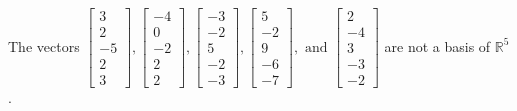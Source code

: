 \begin{exercise}
\begin{exerciseStatement}
  \end{exerciseStatement}
  \begin{exerciseAnswer}
   The vectors \(\left[\begin{array}{r}
3 \\
2 \\
-5 \\
2 \\
3
\end{array}\right] , \left[\begin{array}{r}
-4 \\
0 \\
-2 \\
2 \\
2
\end{array}\right] , \left[\begin{array}{r}
-3 \\
-2 \\
5 \\
-2 \\
-3
\end{array}\right] , \left[\begin{array}{r}
5 \\
-2 \\
9 \\
-6 \\
-7
\end{array}\right] , \text{ and } \left[\begin{array}{r}
2 \\
-4 \\
3 \\
-3 \\
-2
\end{array}\right]\) 
  	 are not  a basis of \(\mathbb{R}^5\).
  


  \end{exerciseAnswer}
\end{exercise}
